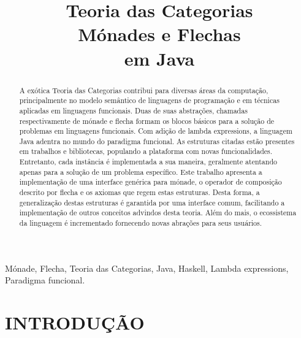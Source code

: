 \documentclass[10pt, conference]{IEEEtran}
\begin{document}

\title { 
	Teoria das Categorias \\
	Mónades e Flechas \\
	em Java 
}

\author{

}
					  
\maketitle

\begin{abstract}
A exótica Teoria das Categorias contribui para diversas áreas da computação, principalmente no modelo semântico de linguagens de programação e em técnicas aplicadas em linguagens funcionais. Duas de suas abstrações, chamadas respectivamente de mónade e flecha formam os blocos básicos para a solução de problemas em linguagens funcionais. Com adição de lambda expressions, a linguagem Java adentra no mundo do paradigma funcional. As estruturas citadas estão presentes em trabalhos e bibliotecas, populando a plataforma com novas funcionalidades. Entretanto, cada instância é implementada a sua maneira, geralmente atentando apenas para a solução de um problema específico. Este trabalho apresenta a implementação de uma interface genérica para mónade, o operador de composição descrito por flecha e os axiomas que regem estas estruturas. Desta forma, a generalização destas estruturas é garantida por uma interface comum, facilitando a implementação de outros conceitos advindos desta teoria. Além do mais, o ecossistema da linguagem é incrementado fornecendo novas abrações para seus usuários.\\
\end{abstract}

\begin{IEEEkeywords}
Mónade, Flecha, Teoria das Categorias, Java, Haskell, Lambda expressions, Paradigma funcional.
\end{IEEEkeywords}

\section{INTRODUÇÃO}
\label{sec:intro}
\end{document}

